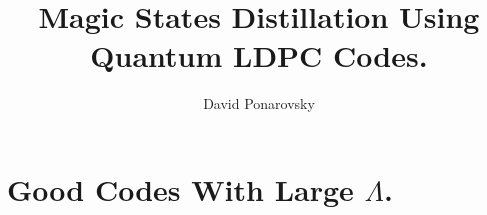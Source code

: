 \documentclass[manuscript,screen,review]{acmart}
\begin{document}

\title{Magic States Distillation Using Quantum LDPC Codes. } 
\author{David Ponarovsky}
\maketitle




%
%

\section{Good Codes With Large $\Lambda$.}
\newcommand*{\DETAILS}{}
\ifdefined\DETAILS
\end{document}

